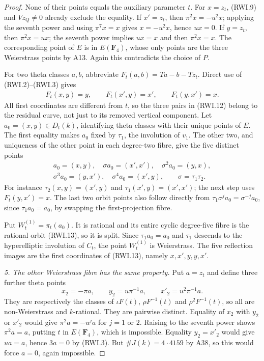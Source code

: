 \documentclass[11pt,a4paper]{article}
\begin{document}
\begin{proof}
None of their points equals the auxiliary parameter
$t$. For $x=z_t$, (RWI.9) and $Vz_Q\ne0$ already
exclude the equality. If $x'=z_t$, then
$\pi^2x=-u^2x$; applying the seventh power and using
$\pi^7x=x$ gives $x=-u^2x$, hence $ux=0$.
If $y=z_t$, then $\pi^2x=ux$; the seventh power
implies $ux=x$ and then $\pi^2x=x$. The corresponding
point of $E$ is in $E(\mathbf F_4)$, whose only points
are the three Weierstrass points by A13. Again this
contradicts the choice of $P$.

For two theta classes $a,b$, abbreviate
$F_t(a,b)=Ta-b-Tz_t$. Direct use of (RWI.2)--(RWI.3)
gives
\[
 \begin{gathered}
 F_t(x,y)=y,\qquad F_t(x',y)=x',\qquad
 F_t(y,x')=x. 
 \end{gathered}
 \tag{RWI.12}
\]
All first coordinates are different from $t$, so the
three pairs in (RWI.12) belong to the residual curve,
not just to its removed vertical component. Let
$a_0=(x,y)\in D_t(k)$, identifying theta classes with
their unique points of $E$. The first equality makes
$a_0$ fixed by $\tau_1$, the involution of $v_1$.
The other two, and uniqueness of the other point in
each degree-two fibre, give the five distinct points
\[
 \begin{gathered}
 a_0=(x,y),\quad \sigma a_0=(x',x'),\quad
 \sigma^2a_0=(y,x),\\
 \sigma^3a_0=(y,x'),\quad\sigma^4a_0=(x',y),
             \qquad \sigma=\tau_1\tau_2.
 \end{gathered}
 \tag{RWI.13}
\]
For instance $\tau_2(x,y)=(x',y)$ and
$\tau_1(x',y)=(x',x')$; the next step uses $F_t(y,x')=x$.
The last two orbit points also follow directly from
$\tau_1\sigma^j a_0=\sigma^{-j}a_0$, since
$\tau_1a_0=a_0$, by swapping the first-projection fibre.

Put $W_t^{(1)}=\pi_t(a_0)$. It is rational and its entire
cyclic degree-five fibre is the rational orbit
(RWI.13), so it is split. Since $\tau_1a_0=a_0$
and $\tau_1$ descends to the hyperelliptic involution
of $C_t$, the point $W_t^{(1)}$ is Weierstrass.
The five reflection images are the first coordinates
of (RWI.13), namely $x,x',y,y,x'$.

\emph{5. The other Weierstrass fibre has the same property.}
Put $a=z_t$ and define three further theta points
\[
       x_2=-\pi a,\qquad y_2=u\pi^{-1}a,
                       \qquad x'_2=u^2\pi^{-1}a.
 \tag{RWI.14}
\]
They are respectively the classes of
$\iota F(t)$, $\rho F^{-1}(t)$ and
$\rho^2F^{-1}(t)$, so all are non-Weierstrass and
$k$-rational. They are pairwise distinct. Equality
of $x_2$ with $y_2$ or $x'_2$ would give
$\pi^2a=-u^j a$ for $j=1$ or $2$. Raising to the
seventh power shows $\pi^2a=a$, putting $t$ in
$E(\mathbf F_4)$, which is impossible. Equality
$y_2=x'_2$ would give $ua=a$, hence $3a=0$ by
(RWI.3). But $\#J(k)=4\cdot4159$ by A38, so this
would force $a=0$, again impossible.


\end{proof}
\end{document}
